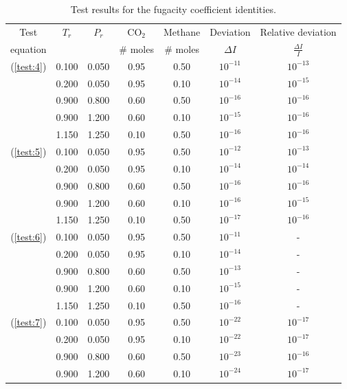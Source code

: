 \documentclass[english]{../thermomemo/thermomemo}
\numberwithin{equation}{section}
\newcommand*{\reff}[1]{(\ref{#1})}
\begin{document}
\begin{table}[h!]
  \centering
    \caption{Test results for the fugacity coefficient identities.}
    \label{tab:testFugacity}
    \begin{tabular}{c c c c c c c}
      \hline
      Test 			& $T_r$ & $P_r$ & CO$_2$	& Methane	& Deviation		& Relative deviation\\
      equation		&		&		& \# moles	& \# moles	& $\Delta I$		& $\frac{\Delta I}{I}$\\
      \hline
      \reff{test:4}	& 0.100	& 0.050	& 0.95		&0.50		& $10^{-11}$	& $10^{-13}$	\\
      				& 0.200	& 0.050	& 0.95		&0.10		& $10^{-14}$	& $10^{-15}$	\\
      				& 0.900	& 0.800	& 0.60		&0.50		& $10^{-16}$	& $10^{-16}$	\\	
      				& 0.900	& 1.200	& 0.60		&0.10		& $10^{-15}$	& $10^{-16}$	\\
      				& 1.150	& 1.250	& 0.10		&0.50		& $10^{-16}$	& $10^{-16}$	\\
      \reff{test:5}	& 0.100	& 0.050	& 0.95		&0.50		& $10^{-12}$	& $10^{-13}$	\\
      				& 0.200	& 0.050	& 0.95		&0.10		& $10^{-14}$	& $10^{-14}$	\\
      				& 0.900	& 0.800	& 0.60		&0.50		& $10^{-16}$	& $10^{-16}$	\\
      				& 0.900	& 1.200	& 0.60		&0.10		& $10^{-16}$	& $10^{-15}$	\\
      				& 1.150	& 1.250	& 0.10		&0.50		& $10^{-17}$	& $10^{-16}$	\\
      \reff{test:6}	& 0.100	& 0.050	& 0.95		&0.50		& $10^{-11}$	& - 	\\
      				& 0.200	& 0.050	& 0.95		&0.10		& $10^{-14}$	& - 	\\
      				& 0.900	& 0.800	& 0.60		&0.50		& $10^{-13}$	& - 	\\
      				& 0.900	& 1.200	& 0.60		&0.10		& $10^{-15}$	& -		\\
      				& 1.150	& 1.250	& 0.10		&0.50		& $10^{-16}$	& - 	\\
      \reff{test:7}	& 0.100	& 0.050	& 0.95		&0.50		& $10^{-22}$	&  $10^{-17}$	\\
      				& 0.200	& 0.050	& 0.95		&0.10		& $10^{-22}$	&  $10^{-17}$ 	\\
      				& 0.900	& 0.800	& 0.60		&0.50		& $10^{-23}$	&  $10^{-16}$	\\
      				& 0.900	& 1.200	& 0.60		&0.10		& $10^{-24}$	&  $10^{-17}$	\\

\end{tabular}
\end{table}
\end{document}
